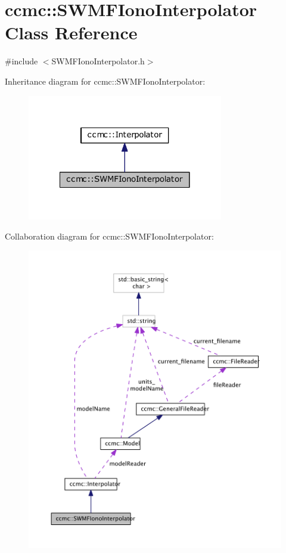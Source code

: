 \hypertarget{classccmc_1_1_s_w_m_f_iono_interpolator}{\section{ccmc\-:\-:S\-W\-M\-F\-Iono\-Interpolator Class Reference}
\label{classccmc_1_1_s_w_m_f_iono_interpolator}
}


{\ttfamily \#include $<$S\-W\-M\-F\-Iono\-Interpolator.\-h$>$}



Inheritance diagram for ccmc\-:\-:S\-W\-M\-F\-Iono\-Interpolator\-:\nopagebreak
\begin{figure}[H]
\begin{center}
\leavevmode
\includegraphics[width=242pt]{classccmc_1_1_s_w_m_f_iono_interpolator__inherit__graph}
\end{center}
\end{figure}


Collaboration diagram for ccmc\-:\-:S\-W\-M\-F\-Iono\-Interpolator\-:\nopagebreak
\begin{figure}[H]
\begin{center}
\leavevmode
\includegraphics[width=350pt]{classccmc_1_1_s_w_m_f_iono_interpolator__coll__graph}
\end{center}
\end{figure}
